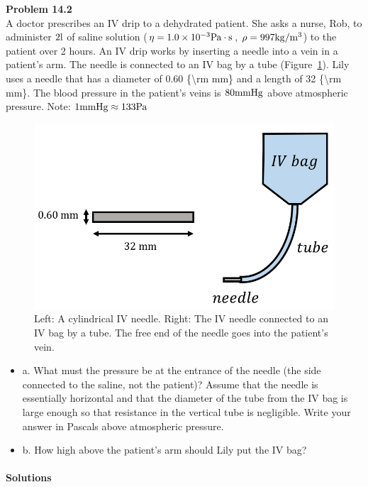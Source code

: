 \begin{framed}
\textbf{Problem 14.2}\\
A doctor prescribes an IV drip to a dehydrated patient. She asks a nurse, Rob, to administer $2 {\rm l}$ of saline solution ($\eta=1.0\times 10^{ -3} {\rm Pa\cdot s}$, $\rho=997 {\rm kg/m^3}$) to the patient over 2 hours. An IV drip works by inserting a needle into a vein in a patient's arm. The needle is connected to an IV bag by a tube (Figure~\ref{fig:fluidmechanics:ivneedle}). Lily uses a needle that has a diameter of 0.60 \{{\textbackslash}rm mm\} and a length of 32 \{{\textbackslash}rm mm\}. The blood pressure in the patient's veins is $80 {\rm mm Hg}$ above atmospheric pressure. Note: $1 {\rm mm Hg}\approx 133 {\rm Pa}$

\begin{figure}[!htbp]
\centering
\includegraphics[width=0.6\linewidth]{files/ivneedle-b6d18068c82e3e182f801489e01b81ca.png}
\caption[]{Left: A cylindrical IV needle. Right: The IV needle connected to an IV bag by a tube. The free end of the needle goes into the patient's vein.}
\label{fig:fluidmechanics:ivneedle}
\end{figure}

\begin{itemize}
\item a. What must the pressure be at the entrance of the needle (the side connected to the saline, not the patient)? Assume that the needle is essentially horizontal and that the diameter of the tube from the IV bag is large enough so that resistance in the vertical tube is negligible. Write your answer in Pascals above atmospheric pressure.
\item b. How high above the patient's arm should Lily put the IV bag?
\end{itemize}
\end{framed}

\paragraph{Solutions}

